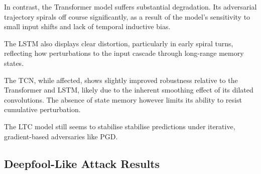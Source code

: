 In contrast, the Transformer model suffers substantial degradation. Its adversarial trajectory spirals off course significantly, as a result of the model's sensitivity to small input shifts and lack of temporal inductive bias.

The LSTM also displays clear distortion, particularly in early spiral turns, reflecting how perturbations to the input cascade through long-range memory states. 

The TCN, while affected, shows slightly improved robustness relative to the Transformer and LSTM, likely due to the inherent smoothing effect of its dilated convolutions. The absence of state memory however limits its ability to resist cumulative perturbation.

The LTC model still seems to stabilise stabilise predictions under iterative, gradient-based adversaries like PGD.

\subsection*{Deepfool-Like Attack Results}

